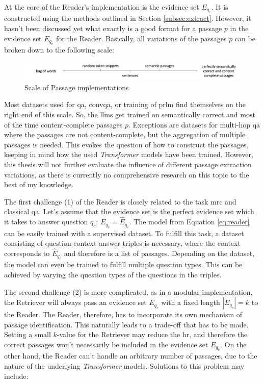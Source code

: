 At the core of the Reader's implementation is the evidence set $E_{q_c}$. It is constructed using the methods outlined in Section \ref{subsec:extract}. However, it hasn't been discussed yet what exactly is a good format for a passage $p$ in the evidence set $E_{q_c}$ for the Reader. Basically, all variations of the passages $p$ can be broken down to the following scale:

\begin{figure}[H]
    \centering
    \includegraphics[width=1\textwidth]{Grafiken/Scale_Passages.png}
    \caption{Scale of Passage implementations}
    \label{fig:scale-passages-implementation}
\end{figure}

Most datasets used for \gls{qa}, \gls{convqa}, or training of \gls{prlm} find themselves on the right end of this scale. So, the \gls{llm}s get trained on semantically correct and most of the time content-complete passages $p$. Exceptions are datasets for multi-hop \gls{qa} where the passages are not content-complete, but the aggregation of multiple passages is needed. This evokes the question of how to construct the passages, keeping in mind how the used \textit{Transformer} models have been trained. However, this thesis will not further evaluate the influence of different passage extraction variations, as there is currently no comprehensive research on this topic to the best of my knowledge.

The first challenge (1) of the Reader is closely related to the task \gls{mrc} and classical \gls{qa}. Let's assume that the evidence set is the perfect evidence set which it takes to answer question $q_c$: $E_{q_c} = \hat{E}_{q_c}$. The model from Equation \ref{eq:reader} can be easily trained with a supervised dataset. To fulfill this task, a dataset consisting of question-context-answer triples is necessary, where the context corresponds to $\hat{E}_{q_c}$ and therefore is a list of passages. Depending on the dataset, the model can even be trained to fulfill multiple question types. This can be achieved by varying the question types of the questions in the triples.

The second challenge (2) is more complicated, as in a modular implementation, the Retriever will always pass an evidence set $E_{q_c}$ with a fixed length $|E_{q_c}| = k$ to the Reader. The Reader, therefore, has to incorporate its own mechanism of passage identification. This naturally leads to a trade-off that has to be made. Setting a small $k$-value for the Retriever may reduce the \gls{hr}, and therefore the correct passages won't necessarily be included in the evidence set $E_{q_c}$. On the other hand, the Reader can't handle an arbitrary number of passages, due to the nature of the underlying \textit{Transformer} models. Solutions to this problem may include:

